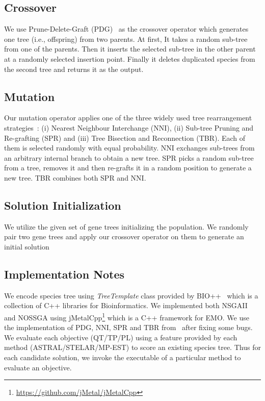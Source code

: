 \subsection{Crossover}\label{subsec:crossver}
We use Prune-Delete-Graft (PDG)~\cite{villalobos2018memetic} as the crossover operator which generates one tree (i.e., offspring) from two parents. At first, It takes a random sub-tree from
one of the parents. Then it inserts the selected sub-tree in the other parent at a
randomly selected insertion point. Finally it deletes duplicated species
from the second tree and returns it as the output.

\subsection{Mutation} \label{subsec:mutation}
Our mutation operator applies one of the three widely used tree rearrangement strategies~\cite{felsenstein2004inferring}: (i) Nearest Neighbour
Interchange (NNI), (ii) Sub-tree Pruning and Re-grafting
(SPR) and (iii) Tree Bisection and Reconnection (TBR). Each of them is selected randomly with equal probability. NNI
exchanges sub-trees from an arbitrary internal branch to obtain
a new tree. SPR picks a random sub-tree from a tree, removes it and then re-grafts it in a random
position to generate a new tree. TBR combines both
SPR and NNI.

\subsection{Solution Initialization}\label{subsec:init}
We utilize the given set of gene trees initializing the population. We randomly pair two gene trees and apply our crossover operator on them to generate an initial solution


\subsection{Implementation Notes}
We encode species tree using \textit{TreeTemplate} class provided by BIO++~\cite{gueguen2013bpp} which is a collection of C++ libraries for Bioinformatics. We implemented both NSGAII and NOSSGA using jMetalCpp\footnote{\url{https://github.com/jMetal/jMetalCpp}} which is a C++ framework for EMO. We use the implementation of PDG, NNI, SPR and TBR from~\cite{zambrano2016mo} after fixing some bugs. We evaluate each objective (QT/TP/PL) using a feature provided by each method (ASTRAL/STELAR/MP-EST) to score an existing species tree. Thus for each candidate solution, we invoke the executable of a particular method to evaluate an objective.

